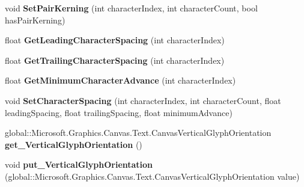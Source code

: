 \begin{DoxyCompactItemize}
void {\bfseries Set\+Pair\+Kerning} (int character\+Index, int character\+Count, bool has\+Pair\+Kerning)
\item 
\mbox{\label{interface_microsoft_1_1_graphics_1_1_canvas_1_1_text_1_1_i_canvas_text_layout_addf54ecd9d5f689e2f22514aabe8c42e}} 
float {\bfseries Get\+Leading\+Character\+Spacing} (int character\+Index)
\item 
\mbox{\label{interface_microsoft_1_1_graphics_1_1_canvas_1_1_text_1_1_i_canvas_text_layout_a199bf5969708e06675546b0d7f97c609}} 
float {\bfseries Get\+Trailing\+Character\+Spacing} (int character\+Index)
\item 
\mbox{\label{interface_microsoft_1_1_graphics_1_1_canvas_1_1_text_1_1_i_canvas_text_layout_a9b50d894550f524f46294a3b5e626497}} 
float {\bfseries Get\+Minimum\+Character\+Advance} (int character\+Index)
\item 
\mbox{\label{interface_microsoft_1_1_graphics_1_1_canvas_1_1_text_1_1_i_canvas_text_layout_a4fe84383740a7e700a50355516d1638a}} 
void {\bfseries Set\+Character\+Spacing} (int character\+Index, int character\+Count, float leading\+Spacing, float trailing\+Spacing, float minimum\+Advance)
\item 
\mbox{\label{interface_microsoft_1_1_graphics_1_1_canvas_1_1_text_1_1_i_canvas_text_layout_a16ecbf654a23cfb935ad2339f832336b}} 
global\+::\+Microsoft.\+Graphics.\+Canvas.\+Text.\+Canvas\+Vertical\+Glyph\+Orientation {\bfseries get\+\_\+\+Vertical\+Glyph\+Orientation} ()
\item 
\mbox{\label{interface_microsoft_1_1_graphics_1_1_canvas_1_1_text_1_1_i_canvas_text_layout_a3745c348ddbf627ac42f367bde371029}} 
void {\bfseries put\+\_\+\+Vertical\+Glyph\+Orientation} (global\+::\+Microsoft.\+Graphics.\+Canvas.\+Text.\+Canvas\+Vertical\+Glyph\+Orientation value)
\item 

\end{DoxyCompactItemize}
